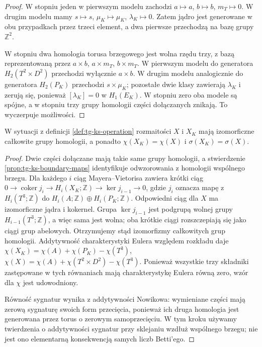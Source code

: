 \begin{proof}
W stopniu jeden w pierwszym modelu zachodzi
$a\mapsto a$, $b\mapsto b$, $m_T\mapsto0$.
W drugim modelu mamy $s\mapsto s$,
$\mu_K\mapsto\mu_K$, $\lambda_K\mapsto0$.
Zatem jądro jest generowane w obu przypadkach
przez trzeci element, a dwa pierwsze przechodzą
na bazę grupy $\mathbb Z^2$.

W stopniu dwa homologia torusa brzegowego jest
wolna rzędu trzy, z bazą reprezentowaną przez
$a\times b$, $a\times m_T$, $b\times m_T$.
W pierwszym modelu do generatora $H_2(T^2\times D^2)$
przechodzi wyłącznie $a\times b$.
W drugim modelu analogicznie do generatora $H_2(P_K)$
przechodzi $s\times\mu_K$; pozostałe dwie klasy
zawierają $\lambda_K$ i zerują się, ponieważ
$[\lambda_K]=0$ w $H_1(E_K)$.
W stopniu zero oba modele są spójne, a w stopniu trzy
grupy homologii części dołączanych znikają. To
wyczerpuje możliwości.
\end{proof}

\begin{wniosek}
\label{cor:tg-ks-invariants}
W sytuacji z definicji \ref{def:tg-ks-operation}
rozmaitości $X$ i $X_K$ mają izomorficzne
całkowite grupy homologii, a ponadto
$\chi(X_K)=\chi(X)$ i $\sigma(X_K)=\sigma(X)$.
\end{wniosek}

\begin{proof}
Dwie części dołączane mają takie same grupy homologii,
a stwierdzenie \ref{prop:tg-ks-boundary-maps} identyfikuje
odwzorowania z homologii wspólnego brzegu.
Dla każdego $i$ ciąg Mayera--Vietorisa zawiera krótki ciąg
$0\to\operatorname{coker}j_i\to H_i(X_K;\mathbb Z)
\to\ker j_{i-1}\to0$, gdzie $j_i$ oznacza mapę z
$H_i(T^3;\mathbb Z)$ do $H_i(A;\mathbb Z)\oplus H_i(P_K;\mathbb Z)$.
Odpowiedni ciąg dla $X$ ma izomorficzne jądra i kokernel.
Grupa $\ker j_{i-1}$ jest podgrupą wolnej grupy
$H_{i-1}(T^3;\mathbb Z)$, a więc sama jest wolna;
oba krótkie ciągi rozszczepiają się jako ciągi grup abelowych.
Otrzymujemy stąd izomorfizmy całkowitych grup homologii. Addytywność charakterystyki Eulera
względem rozkładu daje
$\chi(X_K)=\chi(A)+\chi(P_K)-\chi(T^3)$,
$\chi(X)=\chi(A)+\chi(T^2\times D^2)-\chi(T^3)$.
Ponieważ wszystkie trzy składniki zastępowane w tych
równaniach mają charakterystykę Eulera równą zero,
wzór dla $\chi$ jest udowodniony.

Równość sygnatur wynika z addytywności Nowikowa:
wymieniane części mają zerową sygnaturę swoich form
przecięcia, ponieważ ich druga homologia jest
generowana przez torus o zerowym samoprzecięciu.
W tym kroku używamy twierdzenia o addytywności
sygnatur przy sklejaniu wzdłuż wspólnego brzegu;
nie jest ono elementarną konsekwencją samych
liczb Betti'ego.
\end{proof}

